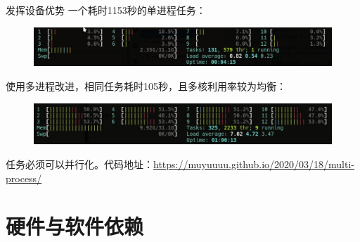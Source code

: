 \documentclass[algorithm,pgfplots]{cuzbeamer}
\begin{document}
    \begin{frame}{发挥设备优势}
        一个耗时1153秒的单进程任务：
        \begin{figure}[h]
            \includegraphics[scale=0.3]{figure/single.png}
        \end{figure}
        
        使用多进程改进，相同任务耗时105秒，且多核利用率较为均衡：
        \begin{figure}[h]
            \includegraphics[scale=0.3]{figure/multi.png}
        \end{figure}
        
        \begin{leftbar}
        任务必须可以并行化。代码地址：{\sffamily \url{https://muyuuuu.github.io/2020/03/18/multi-process/}}
        \end{leftbar}
        
    \end{frame}

    \section{硬件与软件依赖}
\end{document}
